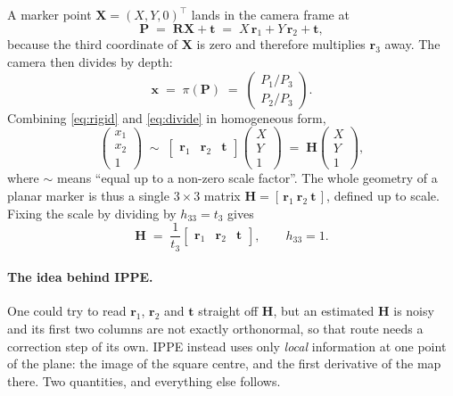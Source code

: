 \documentclass[11pt,a4paper]{article}
\theoremstyle{remark}
\newcommand{\Rmat}{\mathbf{R}}
\newcommand{\Hmat}{\mathbf{H}}
\newcommand{\Pvec}{\mathbf{P}}
\newcommand{\rvec}{\mathbf{r}}
\newcommand{\tvec}{\mathbf{t}}
\newcommand{\xvec}{\mathbf{x}}
\newcommand{\Xvec}{\mathbf{X}}
\begin{document}
A marker point $\Xvec = (X,Y,0)^{\top}$ lands in the camera frame at
\begin{equation}
  \Pvec \;=\; \Rmat\Xvec + \tvec
  \;=\; X\,\rvec_1 + Y\,\rvec_2 + \tvec ,
  \label{eq:rigid}
\end{equation}
because the third coordinate of $\Xvec$ is zero and therefore multiplies
$\rvec_3$ away. The camera then divides by depth:
\begin{equation}
  \xvec \;=\; \pi(\Pvec) \;=\;
  \begin{pmatrix} P_1/P_3 \\[2pt] P_2/P_3 \end{pmatrix}.
  \label{eq:divide}
\end{equation}
Combining \eqref{eq:rigid} and \eqref{eq:divide} in homogeneous form,
\begin{equation}
  \begin{pmatrix} x_1 \\ x_2 \\ 1 \end{pmatrix}
  \;\sim\;
  \begin{bmatrix} \rvec_1 & \rvec_2 & \tvec \end{bmatrix}
  \begin{pmatrix} X \\ Y \\ 1 \end{pmatrix}
  \;=\; \Hmat \begin{pmatrix} X \\ Y \\ 1 \end{pmatrix},
  \label{eq:homography}
\end{equation}
where $\sim$ means ``equal up to a non-zero scale factor''. The whole geometry
of a planar marker is thus a single $3\times3$ matrix
$\Hmat = [\,\rvec_1\ \rvec_2\ \tvec\,]$, defined up to scale. Fixing the scale
by dividing by $h_{33} = t_3$ gives
\begin{equation}
  \Hmat \;=\; \frac{1}{t_3}
  \begin{bmatrix} \rvec_1 & \rvec_2 & \tvec \end{bmatrix},
  \qquad h_{33} = 1 .
  \label{eq:Hscaled}
\end{equation}

\paragraph{The idea behind IPPE.} One could try to read $\rvec_1$, $\rvec_2$
and $\tvec$ straight off $\Hmat$, but an estimated $\Hmat$ is noisy and its
first two columns are not exactly orthonormal, so that route needs a correction
step of its own. IPPE instead uses only \emph{local} information at one point of
the plane: the image of the square centre, and the first derivative of the map
there. Two quantities, and everything else follows.
\end{document}
